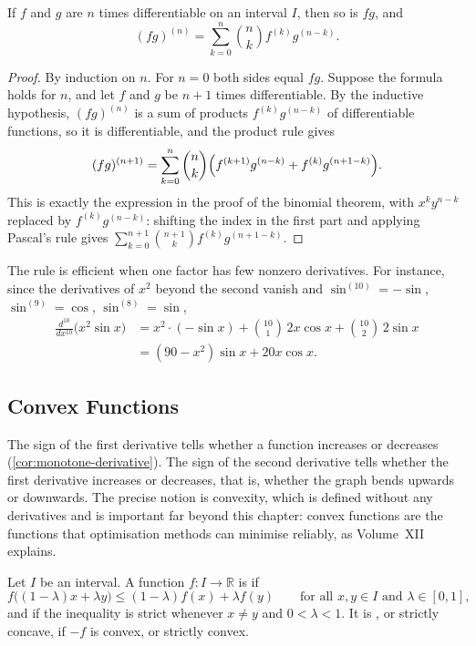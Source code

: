 \begin{theorem}
\label{thm:leibniz-rule}
If $f$ and $g$ are $n$ times differentiable on an interval $I$, then so is $fg$, and
\[
(fg)^{(n)}=\sum_{k=0}^n\binom nk f^{(k)}g^{(n-k)} .
\]
\end{theorem}

\begin{proof}
By induction on $n$. For $n=0$ both sides equal $fg$. Suppose the formula holds for $n$, and let $f$ and $g$ be $n+1$ times differentiable. By the inductive hypothesis, $(fg)^{(n)}$ is a sum of products $f^{(k)}g^{(n-k)}$ of differentiable functions, so it is differentiable, and the product rule gives
\[
(fg)^{(n+1)}=\sum_{k=0}^n\binom nk\Bigl(f^{(k+1)}g^{(n-k)}+f^{(k)}g^{(n+1-k)}\Bigr).
\]
This is exactly the expression in the proof of the binomial theorem, with $x^ky^{n-k}$ replaced by $f^{(k)}g^{(n-k)}$: shifting the index in the first part and applying Pascal's rule gives $\sum_{k=0}^{n+1}\binom{n+1}kf^{(k)}g^{(n+1-k)}$.
\end{proof}

The rule is efficient when one factor has few nonzero derivatives. For instance, since the derivatives of $x^2$ beyond the second vanish and $\sin^{(10)}=-\sin$, $\sin^{(9)}=\cos$, $\sin^{(8)}=\sin$,
\begin{align*}
\frac{d^{10}}{dx^{10}}\bigl(x^2\sin x\bigr)&=x^2\cdot(-\sin x)+\binom{10}1\,2x\cos x+\binom{10}2\,2\sin x\\
&=(90-x^2)\sin x+20x\cos x .
\end{align*}

\subsection{Convex Functions}

The sign of the first derivative tells whether a function increases or decreases (\cref{cor:monotone-derivative}). The sign of the second derivative tells whether the first derivative increases or decreases, that is, whether the graph bends upwards or downwards. The precise notion is convexity, which is defined without any derivatives and is important far beyond this chapter: convex functions are the functions that optimisation methods can minimise reliably, as Volume~XII explains.

\begin{definition}
\label{def:convex}
Let $I$ be an interval. A function $f\colon I\to\mathbb R$ is  if
\[
f\bigl((1-\lambda)x+\lambda y\bigr)\le(1-\lambda)f(x)+\lambda f(y)\qquad\text{for all }x,y\in I\text{ and }\lambda\in[0,1],
\]
and  if the inequality is strict whenever $x\ne y$ and $0<\lambda<1$. It is , or strictly concave, if $-f$ is convex, or strictly convex.
\end{definition}


